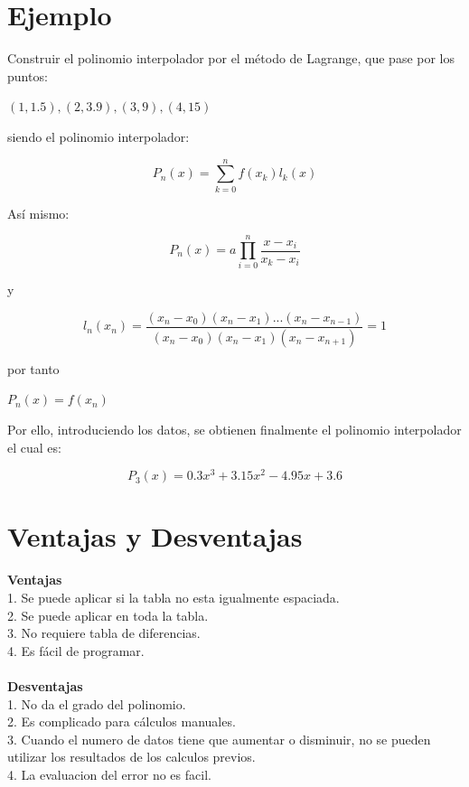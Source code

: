 \documentclass{article}
\begin{document}
\begin{multicols}{2}
\section{Ejemplo}
\label{sec:Ejem}
Construir el polinomio interpolador por el método de Lagrange, que pase por los puntos:

\begin{center}
$(1,1.5), (2,3.9), (3,9), (4,15)$
\end{center}

siendo el polinomio interpolador: 

\begin{center}
$$P_{n}(x)= \sum_{k=0}^{n} f(x_{k})l_{k}(x)$$
\end{center}

Así mismo:

\begin{center}
$$P_{n}(x)=a \prod_{i=0}^{n} \frac{x-x_{i}}{x_{k}-x_{i}} $$
\end{center}

y 
\begin{center}
$$ l_{n}(x_{n})= \frac{(x_{n}-x_{0})(x_{n}-x_{1})...(x_{n}-x_{n-1})}{(x_{n}-x_{0})(x_{n}-x_{1})(x_{n}-x_{n+1})}=1$$
\end{center}

por tanto

\begin{center}
$P_{n}(x)=f(x_{n})$
\end{center}

Por ello, introduciendo los datos, se obtienen finalmente el polinomio interpolador el cual es:

\begin{center}
$$P_{3}(x)=0.3x^{3}+3.15x^{2}-4.95x+3.6$$
\end{center}
\section{Ventajas y Desventajas}
\label{sec:Ven}
\textbf{Ventajas}
\\
1. Se puede aplicar si la tabla no esta igualmente espaciada.
\\
2. Se puede aplicar en toda la tabla.
\\
3. No requiere tabla de diferencias.
\\
4. Es fácil de programar.
\\
\\
\textbf{Desventajas}
\\
1. No da el grado del polinomio.
\\
2. Es complicado para cálculos manuales.
\\
3. Cuando el numero de datos tiene que aumentar o disminuir, no se pueden utilizar los resultados de los calculos previos.
\\
4. La evaluacion del error no es facil.

\end{multicols}
\end{document}
